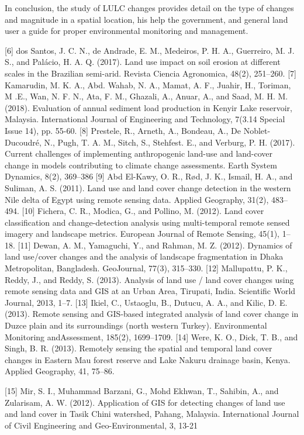 \documentclass[12pt,a4paper]{article}
\begin{document}
	In conclusion, the study of LULC changes provides detail on the	type of changes and magnitude in a spatial location, his help the	government, and general land user a guide for proper environmental monitoring and management.
	

	[6] dos Santos, J. C. N., de Andrade, E. M., Medeiros, P. H. A.,	Guerreiro, M. J. S., and Palácio, H. A. Q. (2017). Land use impact on	soil erosion at different scales in the Brazilian semi-arid. Revista	Ciencia Agronomica, 48(2), 251–260.
	[7] Kamarudin, M. K. A., Abd. Wahab, N. A., Mamat, A. F., Juahir, H.,	Toriman, M .E., Wan, N. F. N., Ata, F. M., Ghazali, A., Anuar, A.,	and Saad, M. H. M. (2018). Evaluation of annual sediment load	production in Kenyir Lake reservoir, Malaysia. International	Journal of Engineering and Technology, 7(3.14 Special Issue 14),	pp. 55-60.
	[8] Prestele, R., Arneth, A., Bondeau, A., De Noblet-Ducoudré, N.,	Pugh, T. A. M., Sitch, S., Stehfest. E., and Verburg, P. H. (2017).	Current challenges of implementing anthropogenic land-use and	land-cover change in models contributing to climate change
	assessments. Earth System Dynamics, 8(2), 369–386
	[9] Abd El-Kawy, O. R., Rød, J. K., Ismail, H. A., and Suliman, A. S.	(2011). Land use and land cover change detection in the western	Nile delta of Egypt using remote sensing data. Applied Geography,	31(2), 483–494.
	[10] Fichera, C. R., Modica, G., and Pollino, M. (2012). Land cover	classification and change-detection analysis using multi-temporal	remote sensed imagery and landscape metrics. European Journal of	Remote Sensing, 45(1), 1–18.
	[11] Dewan, A. M., Yamaguchi, Y., and Rahman, M. Z. (2012).	Dynamics of land use/cover changes and the analysis of landscape	fragmentation in Dhaka Metropolitan, Bangladesh. GeoJournal,	77(3), 315–330.
	[12] Mallupattu, P. K., Reddy, J., and Reddy, S. (2013). Analysis of land	use / land cover changes using remote sensing data and GIS at an	Urban Area, Tirupati, India. Scientific World Journal, 2013, 1–7.
	[13] Ikiel, C., Ustaoglu, B., Dutucu, A. A., and Kilic, D. E. (2013).	Remote sensing and GIS-based integrated analysis of land cover	change in Duzce plain and its surroundings (north western Turkey).	Environmental Monitoring andAssessment, 185(2), 1699–1709.
	[14] Were, K. O., Dick, T. B., and Singh, B. R. (2013). Remotely sensing	the spatial and temporal land cover changes in Eastern Mau forest	reserve and Lake Nakuru drainage basin, Kenya. Applied	Geography, 41, 75–86.
	
	[15] Mir, S. I., Muhammad Barzani, G., Mohd Ekhwan, T., Sahibin, A.,	and Zularisam, A. W. (2012). Application of GIS for detecting	changes of land use and land cover in Tasik Chini watershed,	Pahang, Malaysia. International Journal of Civil Engineering and	Geo-Environmental, 3, 13-21
	
\end{document}
